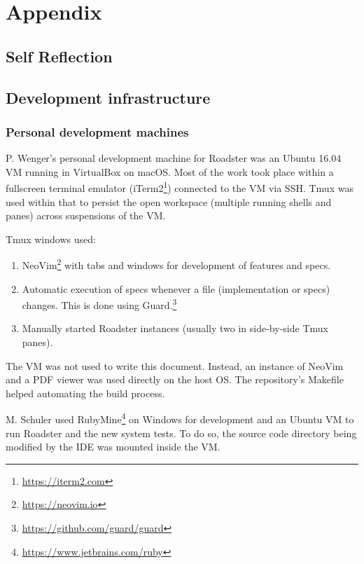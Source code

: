 \documentclass[a4paper]{report}
\begin{document}
\appendix
\part{Appendix}
\chapter{Self Reflection}


\chapter{Development infrastructure}
\section{Personal development machines}
P. Wenger's personal development machine for Roadster was an Ubuntu 16.04 VM
running in VirtualBox on macOS. Most of the work took place within a fullscreen terminal
emulator (iTerm2\footnote{\url{https://iterm2.com}}) connected to the VM via SSH. Tmux was used within that to
persist the open workspace (multiple running shells and panes) across
suspensions of the VM.

Tmux windows used:
\begin{enumerate}
	\item NeoVim\footnote{\url{https://neovim.io}} with tabs and windows for development of features and specs.
	\item Automatic execution of specs whenever a file (implementation or
		specs) changes. This is done using
		Guard.\footnote{\url{https://github.com/guard/guard}}
	\item Manually started Roadster instances (usually two in side-by-side Tmux panes).
\end{enumerate}

The VM was not used to write this document. Instead, an instance of NeoVim and
a PDF viewer was used directly on the host OS. The repository's Makefile helped
automating the build process.

M. Schuler used RubyMine\footnote{\url{https://www.jetbrains.com/ruby}} on Windows for development and an Ubuntu VM to run
Roadster and the new system tests. To do so, the source code directory being
modified by the IDE was mounted inside the VM.
\end{document}
